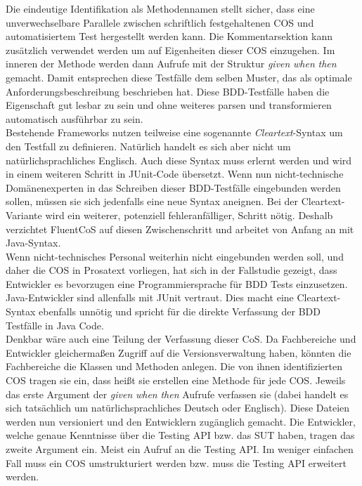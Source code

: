 Die eindeutige Identifikation als Methodennamen stellt sicher, dass eine unverwechselbare Parallele zwischen schriftlich festgehaltenen \Gls{COS} und automatisiertem Test hergestellt werden kann. Die Kommentarsektion kann zusätzlich verwendet werden um auf Eigenheiten dieser \Gls{COS} einzugehen. Im inneren der Methode werden dann Aufrufe mit der Struktur \textit{given} \textit{when} \textit{then} gemacht. Damit entsprechen diese Testfälle dem selben Muster, das \citeauthor{north_official_2015} als optimale Anforderungsbeschreibung beschrieben hat. Diese BDD-Testfälle haben die Eigenschaft gut lesbar zu sein und ohne weiteres parsen und transformieren automatisch ausführbar zu sein.\\
Bestehende Frameworks nutzen teilweise eine sogenannte \textit{Cleartext}-Syntax um den Testfall zu definieren. Natürlich handelt es sich aber nicht um natürlichsprachliches Englisch. Auch diese Syntax muss erlernt werden und wird in einem weiteren Schritt in JUnit-Code übersetzt. Wenn nun nicht-technische Domänenexperten in das Schreiben dieser BDD-Testfälle eingebunden werden sollen, müssen sie sich jedenfalls eine neue Syntax aneignen. Bei der Cleartext-Variante wird ein weiterer, potenziell fehleranfälliger, Schritt nötig. Deshalb verzichtet FluentCoS auf diesen Zwischenschritt und arbeitet von Anfang an mit Java-Syntax.\\
Wenn nicht-technisches Personal weiterhin nicht eingebunden werden soll, und daher die \Gls{COS} in Prosatext vorliegen, hat sich in der Fallstudie gezeigt, dass Entwickler es bevorzugen eine Programmiersprache für \Gls{BDD} Tests einzusetzen. Java-Entwickler sind allenfalls mit JUnit vertraut. Dies macht eine Cleartext-Syntax ebenfalls unnötig und spricht für die direkte Verfassung der \Gls{BDD} Testfälle in Java Code.\\
Denkbar wäre auch eine Teilung der Verfassung dieser CoS. Da Fachbereiche und Entwickler gleichermaßen Zugriff auf die Versionsverwaltung haben, könnten die Fachbereiche die Klassen und Methoden anlegen. Die von ihnen identifizierten \Gls{COS} tragen sie ein, dass heißt sie erstellen eine Methode für jede \Gls{COS}. Jeweils das erste Argument der \textit{given} \textit{when} \textit{then} Aufrufe verfassen sie (dabei handelt es sich tatsächlich um natürlichsprachliches Deutsch oder Englisch). Diese Dateien werden nun versioniert und den Entwicklern zugänglich gemacht. Die Entwickler, welche genaue Kenntnisse über die Testing API bzw. das \Gls{SUT} haben, tragen das zweite Argument ein. Meist ein Aufruf an die Testing API. Im weniger einfachen Fall muss ein \Gls{COS} umstrukturiert werden bzw. muss die Testing API erweitert werden.\\
